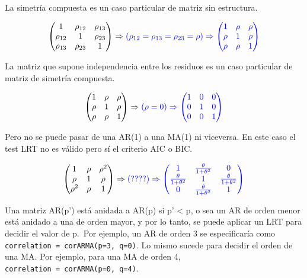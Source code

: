 \documentclass[
]{book}
\begin{document}
La simetría compuesta es un caso particular de matriz sin estructura.

\[
\begin{pmatrix}
1 &  \rho_{12} & \rho_{13} \\
\rho_{12} & 1 & \rho_{23} \\
\rho_{13} & \rho_{23} & 1 \\
\end{pmatrix}
\Rightarrow \color{blue}{(\rho_{12}=\rho_{13}=\rho_{23} =\rho)} \Rightarrow
\begin{pmatrix}
1 &  \rho & \rho \\
\rho & 1 & \rho \\
\rho & \rho & 1 \\
\end{pmatrix}
\]

La matriz que supone independencia entre los residuos es un caso particular de matriz de simetría compuesta.

\[
\begin{pmatrix}
1 &  \rho & \rho \\
\rho & 1 & \rho \\
\rho & \rho & 1 \\
\end{pmatrix}
\Rightarrow \color{blue}{(\rho=0)} \Rightarrow
\begin{pmatrix}
1 &  0 & 0 \\
0 & 1 & 0 \\
0 & 0 & 1 \\
\end{pmatrix}
\]

Pero no se puede pasar de una AR(1) a una MA(1) ni viceversa. En este caso el test LRT no es válido pero sí el criterio AIC o BIC.

\[
\begin{pmatrix}
1 &  \rho & \rho^2 \\
\rho & 1 & \rho \\
\rho^2 & \rho & 1 \\
\end{pmatrix}
\Rightarrow \color{blue}{(????)} \Rightarrow
\begin{pmatrix}
1 & \frac{\theta}{1+\theta^2} & 0 \\
\frac{\theta}{1+\theta^2} & 1 & \frac{\theta}{1+\theta^2} \\
0 & \frac{\theta}{1+\theta^2} & 1 \\
\end{pmatrix}
\]

Una matriz AR(p') está anidada a AR(p) si p' \textless{} p, o sea un AR de orden menor está anidado a una de orden mayor, y por lo tanto, se puede aplicar un LRT para decidir el valor de p.~Por ejemplo, un AR de orden 3 se especificaría como \texttt{correlation\ =\ corARMA(p=3,\ q=0)}. Lo mismo sucede para decidir el orden de una MA. Por ejemplo, para una MA de orden 4, \texttt{correlation\ =\ corARMA(p=0,\ q=4)}.
\end{document}
